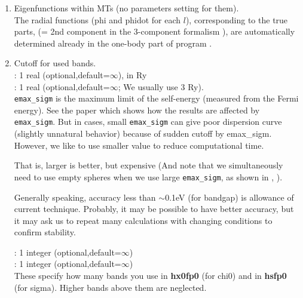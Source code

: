 {\begin{enumerate}
We expand eigenfunctions in the Muffin-tin division of the space.
See Eq.\cite{xxx} in Ref.\cite{xxx}; in
the current $GW$ implementation, we use very simple
form of eigenfuncitons (not by the 3-component formalism in the \cite{xxx}).

Thus the form of expansion is just related to the division of space;
not directly related to the difference among LAPW, LMTO, and PMT.


\item Eigenfunctions within MTs (no parameters setting for them).\\
The radial functions (phi and phidot for each $l$), 
corresponding to the true parts, 
(= 2nd component in the 3-component formalism \cite{xxx}),
are automatically determined already in the one-body part of program .


\item
Cutoff for used bands.\\
: 1 real (optional,default=$\infty$), in Ry\\

: 1 real (optional,default=$\infty$; We usually use 3 Ry).\\
\verb+emax_sigm+ is the maximum limit of the self-energy 
(measured from the Fermi energy). See the paper \cite{xxx} which shows
how the results are affected by {\tt emax\_sigm}.
But in cases, small \verb+emax_sigm+ can give poor dispersion curve
(slightly unnatural behavior) because of sudden cutoff by emax\_sigm.
However, we like to use smaller value to reduce computational time.

That is, larger is better, but expensive (And note that 
we simultaneously need to use empty spheres when we use large
{\tt emax\_sigm}, as shown in \cite{xxx}, ). 

Generally speaking, accuracy less than $\sim $0.1eV (for bandgap) 
is allowance of current technique. Probably, it may be possible 
to have better accuracy, but it may ask us to repeat 
many calculations with changing conditions to confirm stability. 

: 1 integer (optional,default=$\infty$)\\
: 1 integer (optional,default=$\infty$)\\
These specify how many bands you use in {\bf hx0fp0} (for chi0) 
and in {\bf hsfp0} (for sigma). 
Higher bands above them are neglected.


\end{enumerate}}
